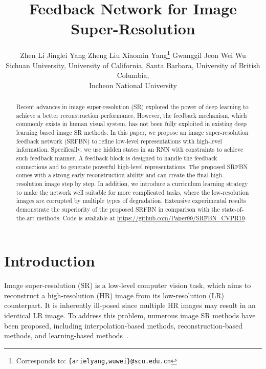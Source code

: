 \documentclass[10pt,twocolumn,letterpaper]{article}
\newcommand*\samethanks[1][\value{footnote}]{\footnotemark[#1]}
\begin{document}
	
\title{Feedback Network for Image Super-Resolution}

\author{Zhen Li \quad Jinglei Yang \quad Zheng Liu \quad Xiaomin Yang\thanks{Corresponds to: {\tt\footnotesize \{arielyang,wuwei\}@scu.edu.cn}} \quad Gwanggil Jeon \quad Wei Wu\samethanks\\
	Sichuan University, University of California, Santa Barbara, University of British Columbia,\\ Incheon National University	
}	

	\maketitle


\begin{abstract}		
	Recent advances in image super-resolution (SR) explored the power of deep learning to achieve a better reconstruction performance. However, the feedback mechanism, which commonly exists in human visual system, has not been fully exploited in existing deep learning based image SR methods. In this paper, we propose an image super-resolution feedback network (SRFBN) to refine low-level representations with high-level information. Specifically, we use hidden states in an RNN with constraints to achieve such feedback manner. A feedback block is designed to handle the feedback connections and to generate powerful high-level representations. The proposed SRFBN comes with a strong early reconstruction ability and can create the final high-resolution image step by step. In addition, we introduce a curriculum learning strategy to make the network well suitable for more complicated tasks, where the low-resolution images are corrupted by multiple types of degradation. Extensive experimental results demonstrate the superiority of the proposed SRFBN in comparison with the state-of-the-art methods. Code is avaliable at \url{https://github.com/Paper99/SRFBN_CVPR19}.
\end{abstract}
	
\section{Introduction}
	Image super-resolution (SR) is a low-level computer vision task, which aims to reconstruct a high-resolution (HR) image from its low-resolution (LR) counterpart. It is inherently ill-posed since multiple HR images may result in an identical LR image. To address this problem, numerous image SR methods have been proposed, including interpolation-based methods\cite{zhang2006edge}, reconstruction-based methods\cite{zhang2012single}, and learning-based methods~\cite{Timofte13, DBLP:journals/tip/PelegE14, Timofte15, DBLP:conf/cvpr/HuangSA15, DBLP:conf/cvpr/SchulterLB15, dong2014learning, Kim_2016_CVPR}.
	
\end{document}
